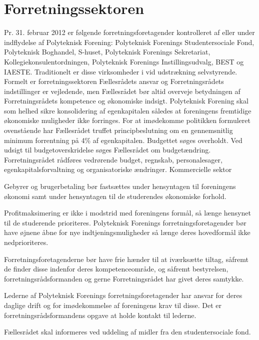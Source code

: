 \section{Forretningssektoren}
Pr. 31. februar 2012 er følgende forretningsforetagender kontrolleret af eller under indflydelse af Polyteknisk Forening: Polyteknisk Forenings Studentersociale Fond, Polyteknisk Boghandel, S-huset, Polyteknisk Forenings Sekretariat, Kollegiekonsulentordningen, Polyteknisk Forenings Instillingsudvalg, BEST og IAESTE.
Traditionelt er disse virksomheder i vid udstrækning selvstyrende. Formelt er forretningssektoren Fællesrådets ansvar
og Forretningsrådets indstillinger er vejledende, men Fællesrådet bør altid overveje betydningen af Forretningsrådets
kompetence og økonomiske indsigt.
Polyteknisk Forening skal som helhed sikre konsolidering af egenkapitalen således at foreningens fremtidige
økonomiske muligheder ikke forringes.
For at imødekomme politikken formuleret ovenstående har Fællesrådet truffet principbeslutning om en gennemsnitlig
minimum forrentning på 4\% af egenkapitalen.
Budgettet søges overholdt. Ved udsigt til budgetoverskridelse søges Fællesrådet om budgetændring.
Forretningsrådet rådføres vedrørende budget, regnskab, personalesager, egenkapitalsforvaltning og organisatoriske
ændringer.
Kommercielle sektor
\begin{list}{•}
\item Gebyrer og brugerbetaling bør fastsættes under hensyntagen til foreningens økonomi samt under hensyntagen
til de studerendes økonomiske forhold.
\item Profitmaksimering er ikke i modstrid med foreningens formål, så længe hensynet til de studerende prioriteres.
Polyteknisk Forenings forretningsforetagender bør have øjnene åbne for nye indtjeningsmuligheder så længe
deres hovedformål ikke nedprioriteres.
\item Forretningsforetagenderne bør have frie hænder til at iværksætte tiltag, såfremt de finder disse indenfor deres
kompetenceområde, og såfremt bestyrelsen, forretningsrådsformanden og gerne Forretningsrådet har givet
deres samtykke.
\item Lederne af Polyteknisk Forenings forretningsforetagender har ansvar for deres daglige drift og for
imødekommelse af foreningens krav til disse. Det er forretningsrådsformandens opgave at holde kontakt til
lederne.
\item Fællesrådet skal informeres ved uddeling af midler fra den studentersociale fond.
\end{list}


